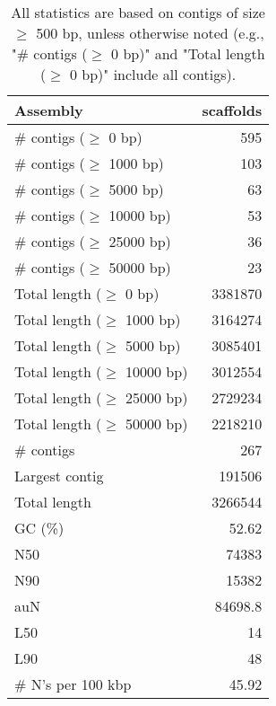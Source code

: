 \documentclass[12pt,a4paper]{article}
\begin{document}
\begin{table}[ht]
\begin{center}
\caption{All statistics are based on contigs of size $\geq$ 500 bp, unless otherwise noted (e.g., "\# contigs ($\geq$ 0 bp)" and "Total length ($\geq$ 0 bp)" include all contigs).}
\begin{tabular}{|l*{1}{|r}|}
\hline
Assembly & scaffolds \\ \hline
\# contigs ($\geq$ 0 bp) & 595 \\ \hline
\# contigs ($\geq$ 1000 bp) & 103 \\ \hline
\# contigs ($\geq$ 5000 bp) & 63 \\ \hline
\# contigs ($\geq$ 10000 bp) & 53 \\ \hline
\# contigs ($\geq$ 25000 bp) & 36 \\ \hline
\# contigs ($\geq$ 50000 bp) & 23 \\ \hline
Total length ($\geq$ 0 bp) & 3381870 \\ \hline
Total length ($\geq$ 1000 bp) & 3164274 \\ \hline
Total length ($\geq$ 5000 bp) & 3085401 \\ \hline
Total length ($\geq$ 10000 bp) & 3012554 \\ \hline
Total length ($\geq$ 25000 bp) & 2729234 \\ \hline
Total length ($\geq$ 50000 bp) & 2218210 \\ \hline
\# contigs & 267 \\ \hline
Largest contig & 191506 \\ \hline
Total length & 3266544 \\ \hline
GC (\%) & 52.62 \\ \hline
N50 & 74383 \\ \hline
N90 & 15382 \\ \hline
auN & 84698.8 \\ \hline
L50 & 14 \\ \hline
L90 & 48 \\ \hline
\# N's per 100 kbp & 45.92 \\ \hline
\end{tabular}
\end{center}
\end{table}
\end{document}
